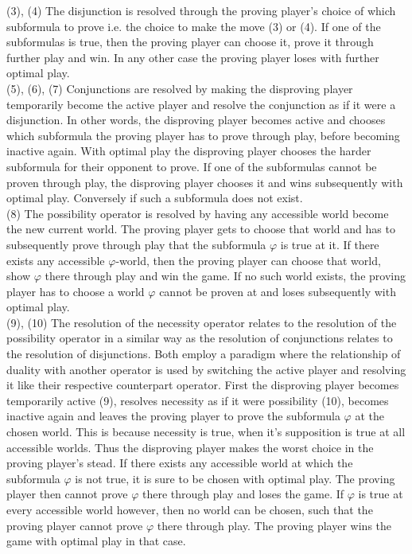 \documentclass[a4paper,american]{paper}
\theoremstyle{definition}\newtheorem{definition}{Definition}
\begin{document}
\indent (3), (4) The disjunction is resolved through the proving player's choice of which subformula to prove i.e. the choice to make the move (3) or (4). If one of the subformulas is true, then the proving player can choose it, prove it through further play and win. In any other case the proving player loses with further optimal play.\\
\indent (5), (6), (7) Conjunctions are resolved by making the disproving player temporarily become the active player and resolve the conjunction as if it were a disjunction. In other words, the disproving player becomes active and chooses which subformula the proving player has to prove through play, before becoming inactive again. With optimal play the disproving player chooses the harder subformula for their opponent to prove. If one of the subformulas cannot be proven through play, the disproving player chooses it and wins subsequently with optimal play. Conversely if such a subformula does not exist.\\
\indent (8) The possibility operator is resolved by having any accessible world become the new current world. The proving player gets to choose that world and has to subsequently prove through play that the subformula $\varphi$ is true at it. If there exists any accessible $\varphi$-world, then the proving player can choose that world, show $\varphi$ there through play and win the game. If no such world exists, the proving player has to choose a world $\varphi$ cannot be proven at and loses subsequently with optimal play.\\
\indent (9), (10) The resolution of the necessity operator relates to the resolution of the possibility operator in a similar way as the resolution of conjunctions relates to the resolution of disjunctions. Both employ a paradigm where the relationship of duality with another operator is used by switching the active player and resolving it like their respective counterpart operator. First the disproving player becomes temporarily active (9), resolves necessity as if it were possibility (10), becomes inactive again and leaves the proving player to prove the subformula $\varphi$ at the chosen world. This is because necessity is true, when it's supposition is true at all accessible worlds. Thus the disproving player makes the worst choice in the proving player's stead. If there exists any accessible world at which the subformula $\varphi$ is not true, it is sure to be chosen with optimal play. The proving player then cannot prove $\varphi$ there through play and loses the game. If $\varphi$ is true at every accessible world however, then no world can be chosen, such that the proving player cannot prove $\varphi$ there through play. The proving player wins the game with optimal play in that case.\\
\end{document}
